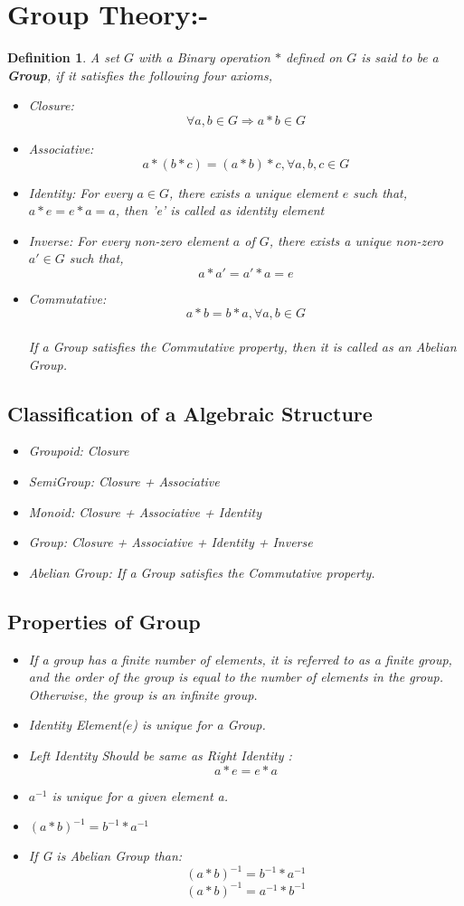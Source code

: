 \documentclass{article}
\newtheorem{defn}{Definition} [section]
\begin{document}
\section{Group Theory:-}
\begin{defn}
A set $G$ with a Binary operation $*$ defined on $G$ is said to be a {\textbf{Group}}, if it satisfies the following four axioms,
\begin{itemize}
	\item Closure: $$\forall a, b \in G \Rightarrow a*b \in G$$
	
	\item Associative: $$a*(b*c)=(a*b)*c, \forall a,b,c \in G$$
	
	\item Identity: For every $a \in G$, there exists a unique element $e$ such that, $a*e=e*a=a$, then 'e' is called as identity element
	\item Inverse: For every non-zero element $a$ of $G$, there exists a unique non-zero $a' \in G$ such that, $$a*a'=a'*a=e$$
	\item Commutative: $$a*b=b*a, \forall a,b \in G$$\\
	If a Group satisfies the Commutative property, then it is called as an Abelian Group.
\end{itemize}
\subsection{Classification of a Algebraic Structure}
\begin{itemize}
    \item Groupoid: Closure
    \item SemiGroup: Closure + Associative
    \item Monoid: Closure + Associative + Identity
    \item Group: Closure + Associative + Identity + Inverse
    \item Abelian Group: If a Group satisfies the Commutative property.
\end{itemize}
\subsection{Properties of Group}
\begin{itemize}
    \item If a group has a finite number of elements, it is referred to as a finite group, and the order of the group is equal to the number of elements in the group. Otherwise, the group is an infinite group.
    \item Identity Element($e$) is unique for a Group.
    \item Left Identity Should be same as Right Identity : $$a*e=e*a$$
    \item $a^{-1}$ is unique for a given element a.
    \item $(a*b)^{-1}=b^{-1}*a^{-1}$
    \item If G is Abelian Group than: $$(a*b)^{-1}=b^{-1}*a^{-1}$$ $$(a*b)^{-1}=a^{-1}*b^{-1}$$
\end{itemize}

\end{defn}
\end{document}
